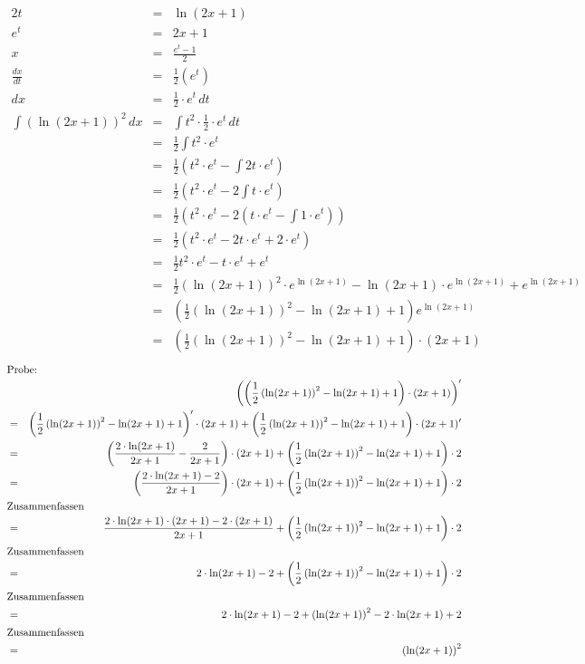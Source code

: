 \documentclass[10pt,a4paper,oneside,ngerman,numbers=noenddot]{scrartcl}
\begin{document}
\subsubsection{} %
\begin{alignat*}{2}
t &=& \ln(2x+1) \\
e^{t} &=& 2x+1 \\
x &=& \frac{e^{t}-1}{2} \\
\frac{dx}{dt} &=& \frac{1}{2}\left(e^{t}\right) \\
dx &=& \frac{1}{2} \cdot e^{t}\,dt \\
\int \left(\ln (2x+1)\right)^{2}\,dx &=& \int t^{2} \cdot \frac{1}{2} \cdot e^{t}\,dt \\
&=& \frac{1}{2} \int t^{2} \cdot e^{t} \\
&=& \frac{1}{2}\left(t^{2} \cdot e^{t} - \int 2t \cdot e^{t} \right) \\
&=& \frac{1}{2}\left(t^{2} \cdot e^{t} - 2\int t \cdot e^{t} \right) \\
&=& \frac{1}{2}\left(t^{2} \cdot e^{t} - 2\left(t \cdot e^{t} - \int 1 \cdot e^{t} \right)\right) \\
&=& \frac{1}{2}\left(t^{2} \cdot e^{t} - 2t \cdot e^{t} + 2 \cdot e^{t} \right) \\
&=& \frac{1}{2}t^{2} \cdot e^{t} - t \cdot e^{t} + e^{t} \\
&=& \frac{1}{2} \left(\ln(2x+1)\right)^{2} \cdot e^{\ln(2x+1)} - \ln(2x+1) \cdot e^{\ln(2x+1)} + e^{\ln(2x+1)} \\
&=& \left(\frac{1}{2} \left(\ln(2x+1)\right)^{2} - \ln(2x+1) + 1\right)e^{\ln(2x+1)} \\
&=& \left(\frac{1}{2} \left(\ln(2x+1)\right)^{2} - \ln(2x+1) + 1\right) \cdot (2x+1)
\end{alignat*}
\begin{alignat*}{2}
\intertext{Probe:}
&& \left(\left(\frac{1}{2} \left(\ln(2x+1)\right)^{2} - \ln(2x+1) + 1\right)\cdot (2x+1)\right)' \\
&=& \left(\frac{1}{2} \left(\ln(2x+1)\right)^{2} - \ln(2x+1) + 1\right)' \cdot (2x+1) + \left(\frac{1}{2}\left(\ln(2x+1)\right)^{2} - \ln(2x+1) + 1\right) \cdot (2x+1)' \\
&=& \left(\frac{2 \cdot \ln(2x+1)}{2x+1} - \frac{2}{2x+1}\right) \cdot (2x+1) + \left(\frac{1}{2}\left(\ln(2x+1)\right)^{2} - \ln(2x+1) + 1\right) \cdot 2 \\
&=& \left(\frac{2 \cdot \ln(2x+1) - 2}{2x+1}\right) \cdot (2x+1) + \left(\frac{1}{2}\left(\ln(2x+1)\right)^{2} - \ln(2x+1) + 1\right) \cdot 2 \\
\intertext{Zusammenfassen}
&=& \frac{2 \cdot \ln(2x+1) \cdot (2x+1) - 2 \cdot (2x+1)}{2x+1} + \left(\frac{1}{2}\left(\ln(2x+1)\right)^{2} - \ln(2x+1) + 1\right) \cdot 2 \\
\intertext{Zusammenfassen}
&=& 2 \cdot \ln(2x+1) - 2 + \left(\frac{1}{2}\left(\ln(2x+1)\right)^{2} - \ln(2x+1) + 1\right) \cdot 2 \\
\intertext{Zusammenfassen}
&=& 2 \cdot \ln(2x+1) - 2 + \left(\ln(2x+1)\right)^{2} - 2 \cdot \ln(2x+1) + 2 \\
\intertext{Zusammenfassen}
&=& \left(\ln(2x+1)\right)^{2}
\end{alignat*}
\end{document}
